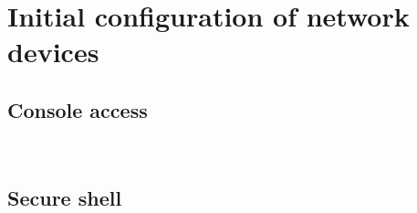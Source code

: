 \chapter{Initial configuration of network devices}

\section{Console access}

~

\section{Secure shell}

~
